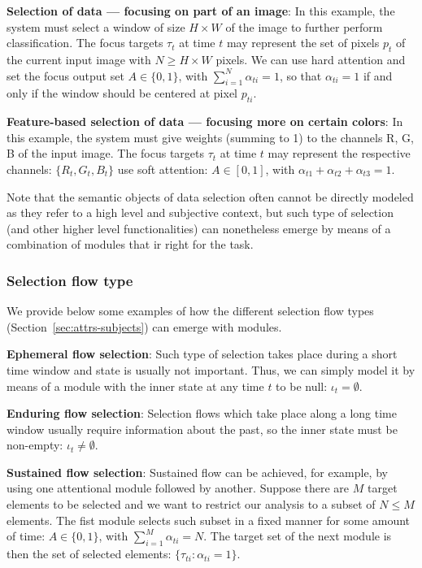 \documentclass[11pt]{article}
\begin{document}
\textbf{Selection of data --- focusing on part of an image}:
In this example, the system must select a window of size $H\times W$ of the image to further perform classification.
The focus targets $\tau_t$ at time $t$ may represent the set of pixels $p_t$ of the current input image
with $N \ge H \times W$ pixels.
We can use hard attention and set the focus output set
$A \in \{0, 1\}$, with $\sum_{i=1}^{N} \alpha_{ti} = 1$,
so that $\alpha_{ti} = 1$ if and only if the window should be centered at pixel $p_{ti}$.

\textbf{Feature-based selection of data --- focusing more on certain colors}:
In this example, the system must give weights (summing to 1) to the channels R, G, B of the input image.
The focus targets $\tau_t$ at time $t$ may represent the respective channels: $\{R_{t}, G_{t}, B_{t}\}$
use soft attention: $A \in [0, 1]$, with $\alpha_{t1} + \alpha_{t2} + \alpha_{t3} = 1$.

Note that the semantic objects of data selection often cannot be directly modeled
as they refer to a high level and subjective context, but
such type of selection (and other higher level functionalities)
can nonetheless emerge by means of a combination of modules that ir right for the task.

\subsubsection{Selection flow type}
We provide below some examples of how the different selection flow types (Section~\ref{sec:attrs-subjects})
can emerge with modules.

\textbf{Ephemeral flow selection}:
Such type of selection takes place during a short
time window and state is usually not important.
Thus, we can simply model it by means of a module with the inner state at any time $t$ to be
null: $\iota_t = \emptyset$.

\textbf{Enduring flow selection}:
Selection flows which take place along a long time window usually require
information about the past, so the inner state must be non-empty: $\iota_t \ne \emptyset$.

\textbf{Sustained flow selection}:
Sustained flow can be achieved, for example, by using
one attentional module followed by another.
Suppose there are $M$ target elements to be selected and we want to restrict
our analysis to a subset of $N \le M$ elements.
The fist module selects such subset in a fixed manner for some amount of time:
$A \in \{0, 1\}$, with $\sum_{i=1}^{M} \alpha_{ti} = N$.
The target set of the next module is then the set of selected elements:
$\{\tau_{ti}: \alpha_{ti} = 1\}$.
\end{document}
